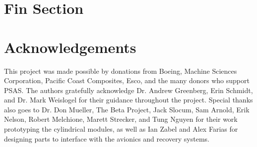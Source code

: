 \documentclass{aiaa-tc}%
\begin{document}
\section{Fin Section}

\section{Acknowledgements}

This project was made possible by donations from Boeing, Machine Sciences Corporation, Pacific Coast Composites, Esco, and the many donors who support PSAS.
The authors gratefully acknowledge Dr. Andrew Greenberg, Erin Schmidt, and Dr. Mark Weislogel for their guidance throughout the project.
Special thanks also goes to Dr. Don Mueller, The Beta Project, Jack Slocum, Sam Arnold, Erik Nelson, Robert Melchione, Marett Strecker, and Tung Nguyen for their work prototyping the cylindrical modules, as well as Ian Zabel and Alex Farias for designing parts to interface with the avionics and recovery systems.

\end{document}
